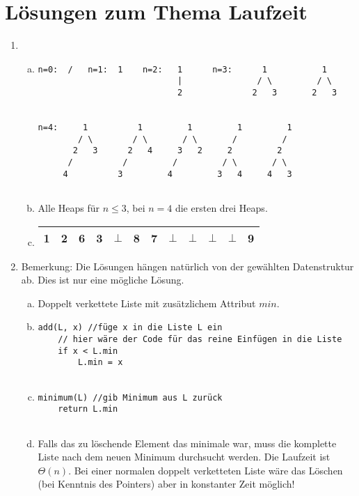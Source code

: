 \documentclass{scrartcl}
\begin{document}
\section*{Lösungen zum Thema Laufzeit}
\begin{enumerate}[(1)]

\item \begin{enumerate}[(a)]
\item
\begin{verbatim}
n=0:  /   n=1:  1    n=2:   1      n=3:      1           1
                            |               / \         / \
                            2              2   3       2   3
                            

n=4:     1          1         1         1         1
        / \        / \       / \       /         /  
       2   3      2   4     3   2     2         2
      /          /         /         / \       / \
     4          3         4         3   4     4   3
     
\end{verbatim}
\item Alle Heaps f\"ur $n\leq 3$, bei $n=4$ die ersten drei Heaps.
\item \begin{tabular}{|c|c|c|c|c|c|c|c|c|c|c|c|}
\hline
1 & 2 & 6 & 3 & $\bot$ & 8 & 7 & $\bot$ & $\bot$ & $\bot$ & $\bot$ & 9 \\ \hline
\end{tabular}
\end{enumerate}

\item 
Bemerkung: Die L\"osungen h\"angen nat\"urlich von der gew\"ahlten Datenstruktur ab. Dies ist nur eine m\"ogliche L\"osung.
\begin{enumerate}[(a)]
\item Doppelt verkettete Liste mit zus\"atzlichem Attribut $min$.
\item
\begin{verbatim}
add(L, x) //füge x in die Liste L ein
    // hier wäre der Code für das reine Einfügen in die Liste
    if x < L.min
    	L.min = x
    	
\end{verbatim}
\item
\begin{verbatim}
minimum(L) //gib Minimum aus L zurück
    return L.min
    	
\end{verbatim}
\item Falls das zu l\"oschende Element das minimale war, muss die komplette Liste nach dem neuen Minimum durchsucht werden. Die Laufzeit ist $\Theta(n)$. Bei einer normalen doppelt verketteten Liste w\"are das L\"oschen (bei Kenntnis des Pointers) aber in konstanter Zeit m\"oglich!
\end{enumerate}


\end{enumerate}
\end{document}

